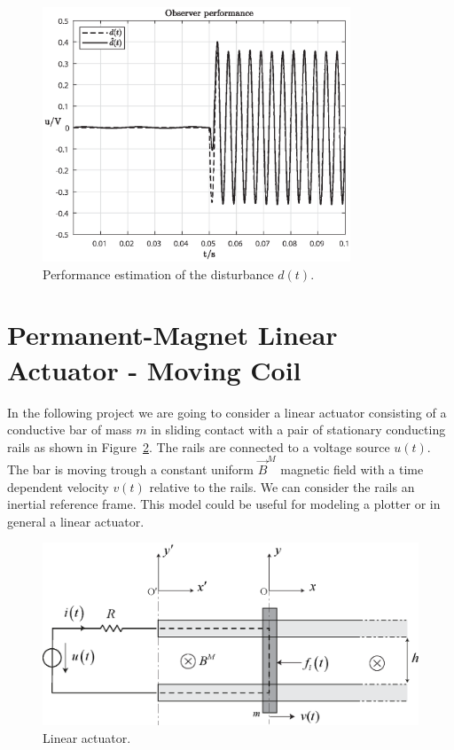 \documentclass[11pt,a4paper,oneside]{book}
\numberwithin{equation}{section}
\theoremstyle{it}
\theoremstyle{definition}
\begin{document}
\begin{figure}[H]
	\centering
	\includegraphics[width = 260pt, angle = 0, 
	keepaspectratio]{figures/single_phase_inverter/observer_p.eps}
	\captionsetup{width=0.5\textwidth, font=small}		
	\caption{Performance estimation of the disturbance $d(t)$.}
	\label{figure_res_observer  }
\end{figure}

\section{Permanent-Magnet Linear Actuator - Moving Coil}
In the following project we are going to consider a linear actuator consisting 
of a conductive bar of mass $m$ in sliding contact with a pair of stationary 
conducting rails as shown in Figure~\ref{figure_moving_coil_1}. The rails are 
connected to a voltage source $u(t)$. The bar is moving trough a constant 
uniform $\vec{B}^M$ magnetic field with a time dependent velocity $v(t)$ 
relative to the rails. We can consider the rails an inertial reference frame. 
This model could be useful for modeling a plotter or in general a linear 
actuator.
\begin{figure}[H]
	\centering
	\includegraphics[width = 360pt, 
	keepaspectratio]{figures/moving_coil/moving_coil_2.eps}
	\captionsetup{width=0.5\textwidth, font=small}		
	\caption{Linear actuator.}
	\label{figure_moving_coil_1}
\end{figure}
\end{document}
